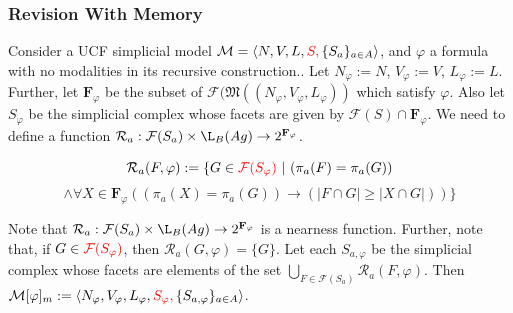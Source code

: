 \documentclass{beamer}
\newcommand{\F}{\mathcal{F}}
\begin{document}
\begin{frame}[fragile]
	\frametitle{Revision With Memory}
	\begin{definition}\label{2DefRevm}
		Consider a UCF simplicial model $\mathcal{M}=\langle N,V,L,\color{red}S,\color{black}\{S_a\}_{a\in A}\rangle$, and $\varphi$ a formula with no modalities in its recursive construction.. Let  $N_\varphi:=N$, $V_\varphi:=V$, $L_\varphi:=L$. Further, let $\mathbf{F}_\varphi$ be the subset of $\mathcal{F}(\mathfrak{M}((N_\varphi,V_\varphi,L_\varphi))$ which satisfy $\varphi$. \color{red} Also let $S_\varphi$ be the simplicial complex whose facets are given by $\F(S)\cap\mathbf{F}_\varphi$. \color{black} We need to define a function $\mathcal{R}_a:\mathcal{F}(S_a)\times\L_{B}(Ag)\rightarrow2^{\mathbf{F}_\varphi}$.
		
		
		$$\mathcal{R}_a(F,\varphi):=\{G\in\color{red}\F(S_\varphi)\color{black}~|~(\pi_a(F)=\pi_a(G))$$
		$$\wedge\forall X\in\mathbf{F}_\varphi((\pi_a(X)=\pi_a(G))\rightarrow(|F\cap G|\geq|X\cap G|))\}$$
		
		Note that $\mathcal{R}_a:\F(S_a)\times\L_{B}(Ag)\rightarrow 2^{\mathbf{F}_\varphi}$ is a nearness function. Further, note that, if $G\in\color{red}\F(S_\varphi)\color{black}$, then $\mathcal{R}_a(G,\varphi)=\{G\}$. Let each $S_{a,\varphi}$ be the simplicial complex whose facets are elements of the set $\bigcup_{F\in\mathcal{F}(S_a)}\mathcal{R}_a(F,\varphi)$. Then $\mathcal{M}[\varphi]_m:=\langle N_\varphi,V_\varphi,L_\varphi,\color{red} S_\varphi,\color{black}\{S_{a,\varphi}\}_{a\in A}\rangle$.
		
	\end{definition}
\end{frame}
\end{document}
